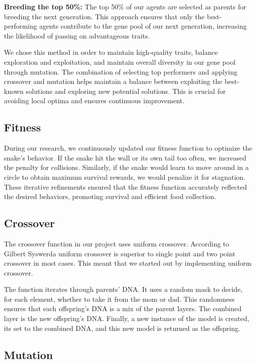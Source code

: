 \documentclass[a4paper, twocolumn]{article}
\begin{document}
\textbf{Breeding the top 50\%:}
The top 50\% of our agents are selected as parents for breeding the next generation. This approach ensures that only the best-performing agents contribute to the gene pool of our next generation, increasing the likelihood of passing on advantageous traits. 

We chose this method in order to maintain high-quality traits, balance exploration and exploitation, and maintain overall diversity in our gene pool through mutation. The combination of selecting top performers and applying crossover and mutation helps maintain a balance between exploiting the best-known solutions and exploring new potential solutions. This is crucial for avoiding local optima and ensures continuous improvement. 


\subsection{Fitness\label{sec:Fitness_analysis}}

During our research, we continuously updated our fitness function to optimize the snake's behavior. If the snake hit the wall or its own tail too often, we increased the penalty for collisions. Similarly, if the snake would learn to move around in a circle to obtain maximum survival rewards, we would penalize it for stagnation. These iterative refinements ensured that the fitness function accurately reflected the desired behaviors, promoting survival and efficient food collection.


\subsection{Crossover\label{sec:Crossover_analysis}}

The crossover function in our project uses uniform crossover. According to Gilbert Syswerda \cite{syswerda1989uniform} uniform crossover is superior to single point and two point crossover in most cases. This meant that we started out by implementing uniform crossover.

The function iterates through parents' DNA. It uses a random mask to decide, for each element, whether to take it from the mom or dad. This randomness ensures that each offspring's DNA is a mix of the parent layers. The combined layer is the new offspring's DNA. Finally, a new instance of the model is created, its set to the combined DNA, and this new model is returned as the offspring.


\subsection{Mutation\label{sec:Mutation_analysis}}
\end{document}
